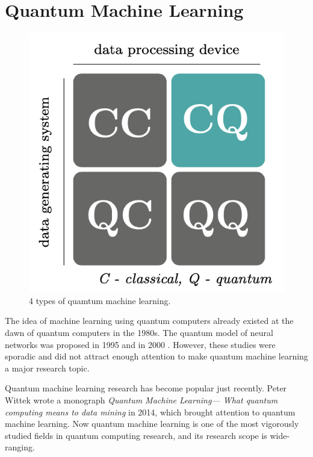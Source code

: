 \section{Quantum Machine Learning}

\begin{figure}[htb]
    \centering
    \includegraphics[keepaspectratio, scale=0.5]{introduction/4types.jpeg}
    \caption{4 types of quamtum machine learning.}
    \label{fig:4types}
\end{figure}

\par The idea of machine learning using quantum computers already existed at the dawn of quantum computers in the 1980s. The quantum model of neural networks was proposed in 1995 \cite{quest} and in 2000 \cite{assomem}. However, these studies were sporadic and did not attract enough attention to make quantum machine learning a major research topic. 

\par Quantum machine learning research has become popular just recently. Peter Wittek wrote a monograph \textit{Quantum Machine Learning— What quantum computing means to data mining} in 2014, which brought attention to quantum machine learning. Now quantum machine learning is one of the most vigorously studied fields in quantum computing research, and its research scope is wide-ranging.

